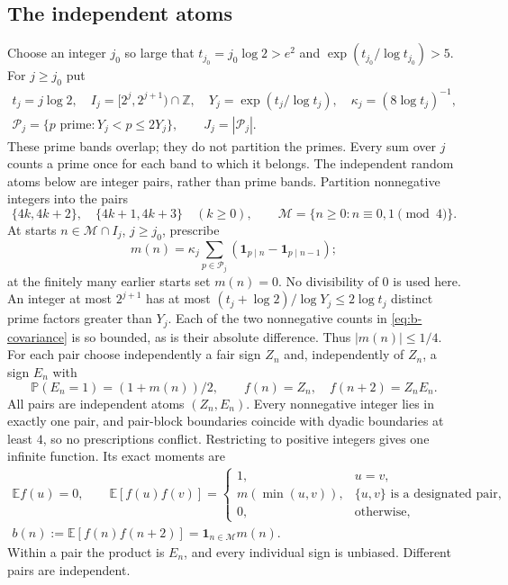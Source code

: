 \documentclass[11pt]{article}
\theoremstyle{definition}
\newcommand{\E}{\mathbb E}
\newcommand{\Prob}{\mathbb P}
\newcommand{\Z}{\mathbb Z}
\newcommand{\ind}{\mathbf 1}
\theoremstyle{remark}
\numberwithin{equation}{section}
\begin{document}
\subsection{The independent atoms}
Choose an integer $j_0$ so large that $t_{j_0}=j_0\log2>e^2$ and
$\exp(t_{j_0}/\log t_{j_0})>5$. For $j\ge j_0$ put
\begin{equation}\label{eq:b-bands}
\begin{gathered}
 t_j=j\log2,\quad I_j=[2^j,2^{j+1})\cap\Z,\quad
 Y_j=\exp(t_j/\log t_j),\quad\kappa_j=(8\log t_j)^{-1},\\
 \mathcal P_j=\{p\text{ prime}:Y_j<p\le2Y_j\},\qquad J_j=|\mathcal P_j|.
\end{gathered}
\end{equation}
These prime bands overlap; they do not partition the primes. Every sum over $j$ counts a prime once
for each band to which it belongs. The independent random atoms below are integer pairs, rather than
prime bands.
Partition nonnegative integers into the pairs
\begin{equation}\label{eq:b-pair-partition}
 \{4k,4k+2\},\quad\{4k+1,4k+3\}\quad(k\ge0),\qquad
 \mathcal M=\{n\ge0:n\equiv0,1\pmod4\}.
\end{equation}
At starts $n\in\mathcal M\cap I_j$, $j\ge j_0$, prescribe
\begin{equation}\label{eq:b-covariance}
 m(n)=\kappa_j\sum_{p\in\mathcal P_j}(\ind_{p\mid n}-\ind_{p\mid n-1});
\end{equation}
at the finitely many earlier starts set $m(n)=0$. No divisibility of $0$ is used here.
An integer at most $2^{j+1}$ has at most
$(t_j+\log2)/\log Y_j\le2\log t_j$ distinct prime factors greater than $Y_j$.
Each of the two nonnegative counts in \eqref{eq:b-covariance} is so bounded, as is their absolute difference.
Thus $|m(n)|\le1/4$.
For each pair choose independently a fair sign $Z_n$ and, independently of $Z_n$, a sign $E_n$ with
\begin{equation}\label{eq:b-assignment}
 \Prob(E_n=1)=(1+m(n))/2,\qquad f(n)=Z_n,\quad f(n+2)=Z_nE_n.
\end{equation}
All pairs are independent atoms $(Z_n,E_n)$. Every nonnegative integer lies in exactly one pair, and
pair-block boundaries coincide with dyadic boundaries at least $4$, so no prescriptions conflict.
Restricting to positive integers gives one infinite function. Its exact moments are
\begin{equation}\label{eq:b-moments}
\begin{gathered}
 \E f(u)=0,\qquad
 \E[f(u)f(v)]=\begin{cases}
 1,&u=v,\\m(\min(u,v)),&\{u,v\}\text{ is a designated pair},\\0,&\text{otherwise},
 \end{cases}\\
 b(n):=\E[f(n)f(n+2)]=\ind_{n\in\mathcal M}m(n).
\end{gathered}
\end{equation}
Within a pair the product is $E_n$, and every individual sign is unbiased. Different pairs are independent.
\end{document}
